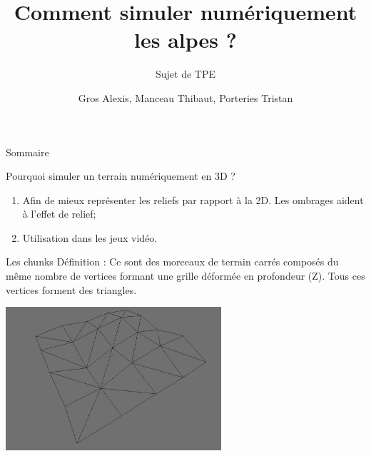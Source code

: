 \documentclass{beamer}
\title{Comment simuler numériquement les alpes ?}
\subtitle{Sujet de TPE}
\author{Gros Alexis, Manceau Thibaut, Porteries Tristan}
\begin{document}
\frame{\titlepage}

\begin{frame}{Sommaire}
\end{frame}

\begin{frame}{Pourquoi simuler un terrain numériquement en 3D ?}
  \begin{enumerate}
    \item Afin de mieux représenter les reliefs par rapport à la 2D. Les ombrages aident à l'effet de relief;
    \item Utilisation dans les jeux vidéo.
  \end{enumerate}
\end{frame}

\begin{frame}{Les chunks}
  Définition : Ce sont des morceaux de terrain carrés composés du même nombre de vertices formant une grille déformée en profondeur (Z).
  Tous ces vertices forment des triangles.
  \begin{center}
    \includegraphics[width=8cm]{chunk_simple_wireframe.png}
  \end{center}
\end{frame}
\end{document}
